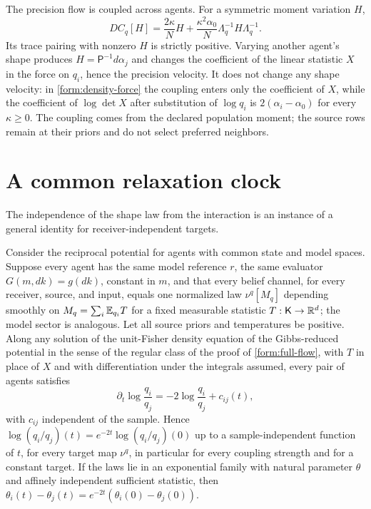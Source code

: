 The precision flow is coupled across agents. For a symmetric moment
variation $H$,
\begin{equation}
 DC_q[H]=\frac{2\kappa}{N}H
 +\frac{\kappa^2\alpha_0}{N}\Lambda_q^{-1}H\Lambda_q^{-1}.
 \label{form:coupling}
\end{equation}
Its trace pairing with nonzero $H$ is strictly positive. Varying another
agent's shape produces $H=\mathsf P^{-1}d\alpha_j$ and changes the coefficient of the linear statistic $X$ in the force on $q_i$, hence the precision velocity. It does not change any shape velocity: in \cref{form:density-force} the coupling enters only the coefficient of $X$, while the coefficient of $\log\det X$ after substitution of $\log q_i$ is $2(\alpha_i-\alpha_0)$ for every $\kappa\ge0$. The coupling comes from the declared population moment;
the source rows remain at their priors and do not select preferred neighbors.

\section{A common relaxation clock}

The independence of the shape law from the interaction is an instance of a general identity for receiver-independent targets.

Consider the reciprocal potential for agents with common state and model spaces. Suppose every agent has the same model reference $r$, the same evaluator $G(m,dk)=g(dk)$, constant in $m$, and that every belief channel, for every receiver, source, and input, equals one normalized law $\nu^q[M_q]$ depending smoothly on $M_q=\sum_i\mathbb E_{q_i}T$ for a fixed measurable statistic $T:\mathsf K\to\mathbb R^d$; the model sector is analogous. Let all source priors and temperatures be positive. Along any solution of the unit-Fisher density equation of the Gibbs-reduced potential in the sense of the regular class of the proof of \cref{form:full-flow}, with $T$ in place of $X$ and with differentiation under the integrals assumed, every pair of agents satisfies
\begin{equation}
 \partial_t\log\frac{q_i}{q_j}=-2\log\frac{q_i}{q_j}+c_{ij}(t),
 \label{form:common-clock}
\end{equation}
with $c_{ij}$ independent of the sample. Hence $\log(q_i/q_j)(t)=e^{-2t}\log(q_i/q_j)(0)$ up to a sample-independent function of $t$, for every target map $\nu^q$, in particular for every coupling strength and for a constant target. If the laws lie in an exponential family with natural parameter $\theta$ and affinely independent sufficient statistic, then $\theta_i(t)-\theta_j(t)=e^{-2t}(\theta_i(0)-\theta_j(0))$.

